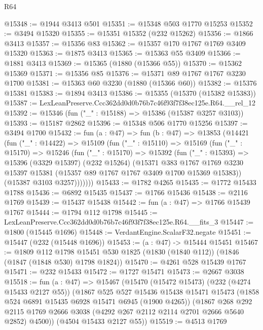 \begin{lexlean}{R64}
\begin{coremodule}
@15348 := @1944 @3413 @501
@15351 := @15348 @503 @1770 @15253
@15352 := @3494 @15320
@15355 := @15351 @15352 (@232 @15262)
@15356 := @1866 @3413
@15357 := @15356 @83
@15362 := @15357 @170 @1767 @1769 @3409 @15320
@15363 := @1875 @3413
@15365 := @15363 @55 @3409
@15366 := @1881 @3413
@15369 := @15365 (@1880 (@15366 @55))
@15370 := @15362 @15369
@15371 := @15356 @85
@15376 := @15371 @89 @1767 @1767 @3230 @1700
@15381 := @15363 @60 @3230 (@1880 (@15366 @60))
@15382 := @15376 @15381
@15383 := @1894 @3413
@15386 := @15355 (@15370 (@15382 @15383))
@15387 := LexLeanPreserve.Ccc362dd0d0b76b7c46f93f7f38ec125e.R64.__rel_12
@15392 := @15346 (fun ("_" : @15188) => @15386 (@15387 @3257 @3103))
@15393 := @15187 @2862
@15396 := @15348 @506 @1770 @15256
@15397 := @3494 @1700
@15432 := fun (a : @47) =>
  fun (b : @47) =>
  @13853
    (@14421
      (fun ("_" : @14422) =>
      @15109
        (fun ("_" : @15110) =>
        @15169
          (fun ("_" : @15170) =>
          @15246
            (fun ("_" : @15170) =>
            @15392
              (fun ("_" : @15393) =>
              @15396
                (@3329 @15397)
                (@232 @15264)
                (@15371
                  @383
                  @1767
                  @1769
                  @3230
                  @15397
                  @15381
                  (@15357 @89 @1767 @1767 @3409 @1700 @15369 @15383))
                (@15387 @3103 @3257)))))))
@15433 := @1782 @4265
@15435 := @1772 @15433 @1788
@15436 := @6892 @15435
@15437 := @1766 @15436
@15438 := @2116 @1769
@15439 := @15437 @15438
@15442 := fun (a : @47) => @1766 @15439 @1767
@15444 := @1794 @112 @1798
@15445 := LexLeanPreserve.Ccc362dd0d0b76b7c46f93f7f38ec125e.R64.__fits_3
@15447 := @1800 (@15445 @1696)
@15448 := VerdantEngine.ScalarF32.negate
@15451 := @15447 (@232 (@15448 @1696))
@15453 := (a : @47) -> @15444 @15451
@15467 := @1809
    @112
    @1798
    @15451
    @530
    @1825
    (@1830 (@1840 @112))
    (@1846 (@1847 (@1848 @530) @1798 @1824))
@15470 := @4261 @528 @15439 @1767
@15471 := @232 @15433
@15472 := @1727 @15471
@15473 := @2667 @3038
@15518 := fun (a : @47) =>
  @15467
    (@15470
      (@15472 @15473)
      (@232 (@4274 @15433 @2127 @55))
      (@1867
        @525
        @527
        @15436
        @15438
        @15471
        @15473
        (@1858 @524 @6891 @15435 @6928 @15471 @6945 (@1900 @4265))
        (@1867
          @268
          @292
          @2115
          @1769
          @2666
          @3038
          (@4292 @267 @2112 @2114 @2701 @2666 @5640 @2852)
          @4500))
      (@4504 @15433 @2127 @55))
@15519 := @4513 @1769

\end{coremodule}
\end{lexlean}
